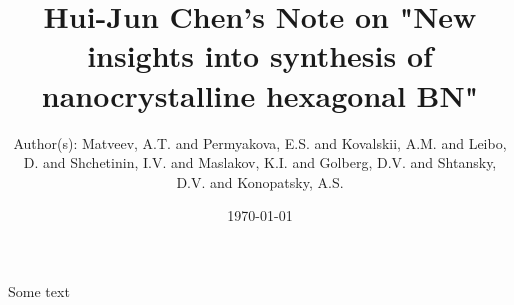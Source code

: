 \documentclass[a4paper]{article}
\title{Hui-Jun Chen's Note on "New insights into synthesis of nanocrystalline hexagonal BN"}
\author{Author(s): Matveev, A.T. and Permyakova, E.S. and Kovalskii, A.M. and Leibo, D. and Shchetinin, I.V. and Maslakov, K.I. and Golberg, D.V. and Shtansky, D.V. and Konopatsky, A.S.}
\date{\today}
\begin{document}
\maketitle

Some text
\end{document}
